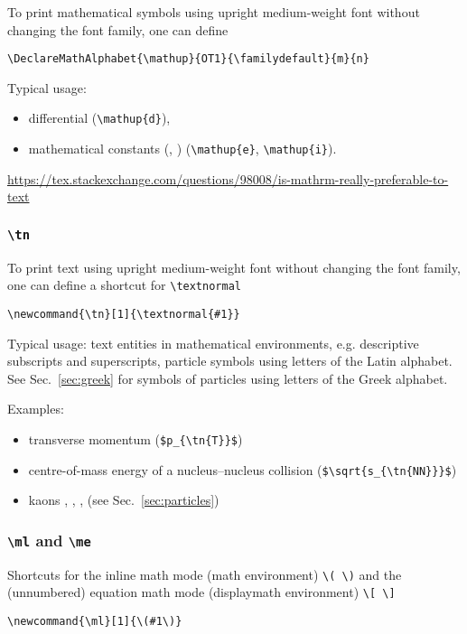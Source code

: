 \documentclass[12pt,a4paper]{article}
\begin{document}
To print mathematical symbols using upright medium-weight font without changing the font family, one can define

\verb_\DeclareMathAlphabet{\mathup}{OT1}{\familydefault}{m}{n}_

Typical usage:
\begin{itemize}
\item differential  (\verb_\mathup{d}_),
\item mathematical constants (, ) (\verb_\mathup{e}_, \verb_\mathup{i}_).
\end{itemize}

\url{https://tex.stackexchange.com/questions/98008/is-mathrm-really-preferable-to-text}

\cprotect\subsubsection{\verb_\tn_}

To print text using upright medium-weight font without changing the font family, one can define a shortcut for \verb_\textnormal_

\verb_\newcommand{\tn}[1]{\textnormal{#1}}_

Typical usage: text entities in mathematical environments, e.g. descriptive subscripts and superscripts, particle symbols using letters of the Latin alphabet.
See Sec.~\ref{sec:greek} for symbols of particles using letters of the Greek alphabet.

Examples:
\begin{itemize}
\item transverse momentum  (\verb!$p_{\tn{T}}$!)
\item centre-of-mass energy of a nucleus--nucleus collision  (\verb!$\sqrt{s_{\tn{NN}}}$!)
\item kaons \kaonp, \kaonm, \kaons, \kaonl{} (see Sec.~\ref{sec:particles})
\end{itemize}

\cprotect\subsubsection{\verb_\ml_ and \verb_\me_}

Shortcuts for the inline math mode (math environment) \verb_\( \)_ and the (unnumbered) equation math mode (displaymath environment) \verb_\[ \]_

\verb_\newcommand{\ml}[1]{\(#1\)}_
\end{document}

